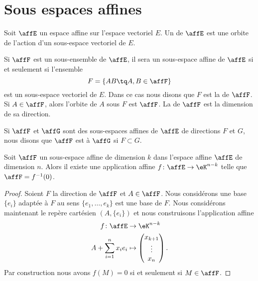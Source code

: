 \section{Sous espaces affines}

\begin{definition}      \label{DEFooJSUHooJjtpwz}
	Soit \( \affE\) un espace affine sur l'espace vectoriel \( E\). Un  de \( \affE\) est une orbite de l'action d'un sous-espace vectoriel de \( E\).
\end{definition}

Si \( \affF\) est un sous-ensemble de \( \affE\), il sera un sous-espace affine de \( \affE\) si et seulement si l'ensemble
\begin{equation}
	F=\{ AB\tq A,B\in\affF \}
\end{equation}
est un sous-espace vectoriel de \( E\). Dans ce cas nous disons que \( F\) est la  de \( \affF\). Si \( A\in\affF\), alors l'orbite de \( A\) sous \( F\) est \( \affF\). La  de \( \affF\) est la dimension de sa direction.

Si \( \affF\) et \( \affG\) sont des sous-espaces affines de \( \affE\) de directions \( F\) et \( G\), nous disons que \( \affF\) est  à \( \affG\) si \( F\subset G\).

\begin{proposition}
	Soit \( \affF\) un sous-espace affine de dimension \( k\) dans l'espace affine \( \affE\) de dimension \( n\). Alors il existe une application affine \( f\colon \affE\to \eK^{n-k}\) telle que \( \affF=f^{-1}(0)\).
\end{proposition}

\begin{proof}
	Soient \( F\) la direction de \( \affF\) et \( A\in\affF\). Nous considérons une base \( \{ e_i \}\) adaptée à \( F\) au sens \( \{ e_1,\ldots, e_k \}\) est une base de \( F\). Nous considérons maintenant le repère cartésien \( (A,\{ e_i \})\) et nous construisons l'application affine
	\begin{equation}
		\begin{aligned}
			f\colon \affE        & \to \eK^{n-k}          \\
			A+\sum_{i=1}^nx_ie_i & \mapsto \begin{pmatrix}
				                               x_{k+1} \\
				                               \vdots  \\
				                               x_n
			                               \end{pmatrix}.
		\end{aligned}
	\end{equation}
	Par construction nous avons \( f(M)=0\) si et seulement si \( M\in\affF\).
\end{proof}

